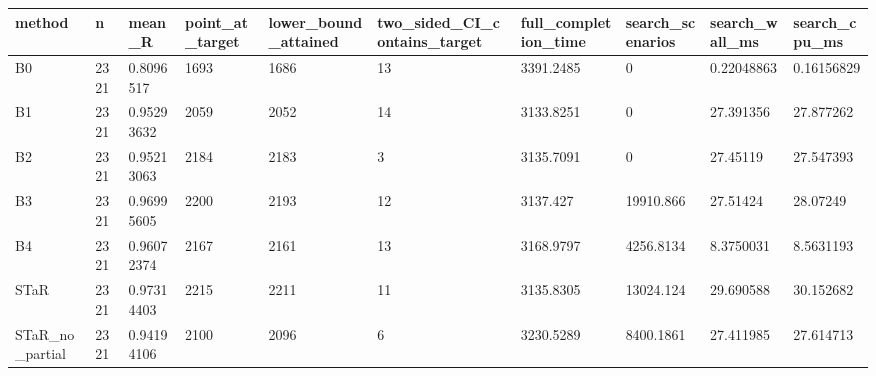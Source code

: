 \begin{tabular}{llllllllll}
\hline
method & n & mean\_R & point\_at\_target & lower\_bound\_attained & two\_sided\_CI\_contains\_target & full\_completion\_time & search\_scenarios & search\_wall\_ms & search\_cpu\_ms \\
\hline
B0 & 2321 & 0.8096517 & 1693 & 1686 & 13 & 3391.2485 & 0 & 0.22048863 & 0.16156829 \\
B1 & 2321 & 0.95293632 & 2059 & 2052 & 14 & 3133.8251 & 0 & 27.391356 & 27.877262 \\
B2 & 2321 & 0.95213063 & 2184 & 2183 & 3 & 3135.7091 & 0 & 27.45119 & 27.547393 \\
B3 & 2321 & 0.96995605 & 2200 & 2193 & 12 & 3137.427 & 19910.866 & 27.51424 & 28.07249 \\
B4 & 2321 & 0.96072374 & 2167 & 2161 & 13 & 3168.9797 & 4256.8134 & 8.3750031 & 8.5631193 \\
STaR & 2321 & 0.97314403 & 2215 & 2211 & 11 & 3135.8305 & 13024.124 & 29.690588 & 30.152682 \\
STaR\_no\_partial & 2321 & 0.94194106 & 2100 & 2096 & 6 & 3230.5289 & 8400.1861 & 27.411985 & 27.614713 \\
\hline
\end{tabular}
